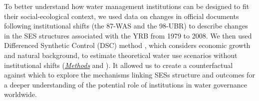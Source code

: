 To better understand how water management institutions can be designed to fit their social-ecological context, we used data on changes in official documents following institutional shifts (the 87-WAS and the 98-UBR) to describe changes in the SES structures associated with the YRB from 1979 to 2008.
We then used Differenced Synthetic Control (DSC) method \cite{arkhangelsky2021}, which considers economic growth and natural background, to estimate theoretical water use scenarios without institutional shifts (\textit{\hyperref[{sec:methods}]{Methods}} and \textit{}).
It allowed us to create a counterfactual against which to explore the mechanisms linking SESs structure and outcomes for a deeper understanding of the potential role of institutions in water governance worldwide.

